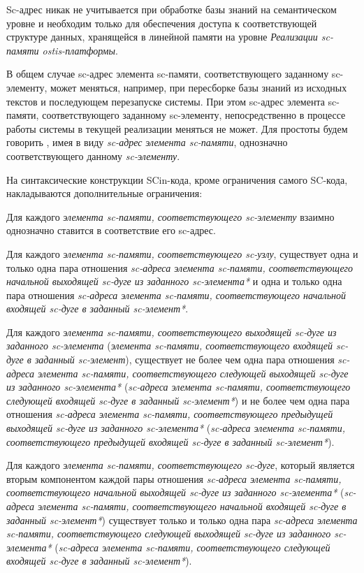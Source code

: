 Sc-адрес никак не учитывается при обработке базы знаний на семантическом уровне и необходим только для обеспечения доступа к соответствующей структуре данных, хранящейся в линейной памяти на уровне \textit{Реализации sc-памяти ostis-платформы}.

В общем случае sc-адрес элемента sc-памяти, соответствующего заданному sc-элементу, может меняться, например, при пересборке базы знаний из исходных текстов и последующем перезапуске системы. При этом sc-адрес элемента sc-памяти, соответствующего заданному sc-элементу, непосредственно в процессе работы системы в текущей реализации меняться не может. Для простоты будем говорить , имея в виду \textit{sc-адрес} \textit{элемента sc-памяти}, однозначно соответствующего данному \textit{sc-элементу}.

На синтаксические конструкции SCin-кода, кроме ограничения самого SC-кода, накладываются дополнительные ограничения:
\begin{textitemize}
    \item Для каждого \textit{элемента sc-памяти, соответствующего sc-элементу} взаимно однозначно ставится в соответствие его sc-адрес.
    \item Для каждого \textit{элемента sc-памяти, соответствующего sc-узлу}, существует одна и только одна пара отношения \textit{sc-адреса элемента sc-памяти, соответствующего начальной выходящей sc-дуге из заданного sc-элемента*} и одна и только одна пара отношения \textit{sc-адреса элемента sc-памяти, соответствующего начальной входящей sc-дуге в заданный sc-элемент*}.
    \item Для каждого \textit{элемента sc-памяти, соответствующего выходящей sc-дуге из заданного sc-элемента} (\textit{элемента sc-памяти, соответствующего входящей sc-дуге в заданный sc-элемент}), существует не более чем одна пара отношения \textit{sc-адреса элемента sc-памяти, соответствующего следующей выходящей sc-дуге из заданного sc-элемента*} (\textit{sc-адреса элемента sc-памяти, соответствующего следующей входящей sc-дуге в заданный sc-элемент*}) и не более чем одна пара отношения \textit{sc-адреса элемента sc-памяти, соответствующего предыдущей выходящей sc-дуге из заданного sc-элемента*} (\textit{sc-адреса элемента sc-памяти, соответствующего предыдущей входящей sc-дуге в заданный sc-элемент*}).
    \item Для каждого \textit{элемента sc-памяти, соответствующего sc-дуге}, который является вторым компонентом каждой пары отношения \textit{sc-адреса элемента sc-памяти, соответствующего начальной выходящей sc-дуге из заданного sc-элемента*} (\textit{sc-адреса элемента sc-памяти, соответствующего начальной входящей sc-дуге в заданный sc-элемент*}) существует только и только одна пара \textit{sc-адреса элемента sc-памяти, соответствующего следующей выходящей sc-дуге из заданного sc-элемента*} (\textit{sc-адреса элемента sc-памяти, соответствующего следующей входящей sc-дуге в заданный sc-элемент*}).
\end{textitemize}

